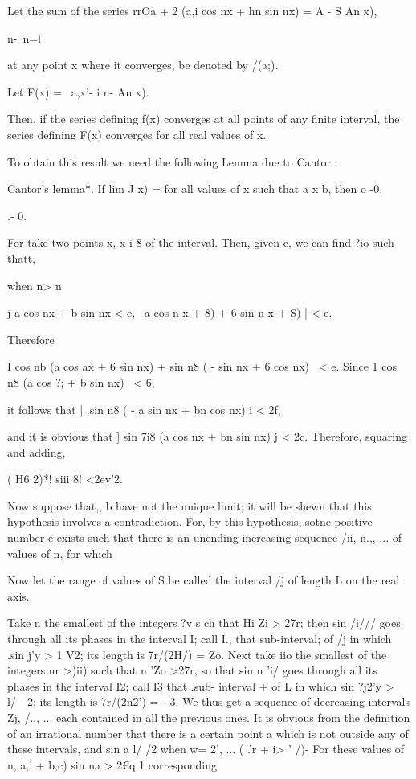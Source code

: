 Let the sum of the series rrOa + 2 (a,i cos nx + hn sin nx) = A - S An
x),

  n-\ n=l

at any point x where it converges, be denoted by /(a;).

Let F(x) = \ a,x'- i n- An x).

Then, if the series defining f(x) converges at all points of any
finite interval, the series defining F(x) converges for all real
values of x.

To obtain this result we need the following Lemma due to Cantor :

Cantor's lemma*. If lim J x) = for all values of x such that a x b,
then o -0,

 .- 0.

For take two points x, x-i-8 of the interval. Then, given e, we can
find ?io such thatt,

when n> n

j a cos nx + b sin nx < e, \ a cos n x + 8) + 6 sin n x + S) | < e.

Therefore

I cos nb (a cos ax + 6 sin nx) + sin n8 ( - sin nx + 6 cos nx) \ < e.
Since 1 cos n8 (a cos ?; + b sin nx) \ < 6,

it follows that | .sin n8 ( - a sin nx + bn cos nx) i < 2f,

and it is obvious that ] sin 7i8 (a cos nx + bn sin nx) j < 2c.
Therefore, squaring and adding,

( H6 2)*! siii 8! <2ev'2.

Now suppose that,, b have not the unique limit; it will be shewn
that this hypothesis involves a contradiction. For, by this
hypothesis, sotne positive number e exists such that there is an
unending increasing sequence /ii, n.,, ... of values of n, for which

Now let the range of values of S be called the interval /j of length L
on the real axis.

Take n the smallest of the integers ?v s ch that Hi Zi > 27r; then
sin /i/// goes through all its phases in the interval I; call I.,
that sub-interval; of /j in which .sin j'y > 1 V2; its length is
7r/(2H/) = Zo. Next take iio the smallest of the integers nr >)ii)
such that n 'Zo >27r, so that sin n 'i/ goes through all its phases in
the interval I2; call I3 that .sub- interval + of L in which sin ?j2'y
> l/\ \ 2; its length is 7r/(2n2') = - 3. We thus get a sequence of
decreasing intervals Zj, /.,, ... each contained in all the previous
ones. It is obvious from the definition of an irrational number that
there is a certain point a which is not outside any of these
intervals, and sin a l/ /2 when w= 2', ... ( .'r + i> ' /)- For these
values of n, a,' + b,c) sin na > 2€q 1%
corresponding

